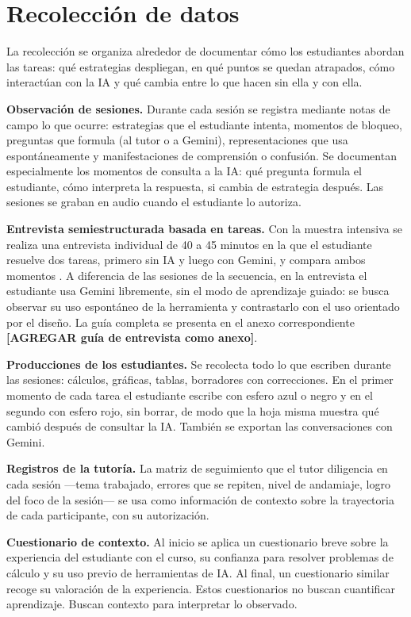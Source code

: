 \section{Recolección de datos}

La recolección se organiza alrededor de documentar cómo los estudiantes abordan las tareas: qué estrategias despliegan, en qué puntos se quedan atrapados, cómo interactúan con la IA y qué cambia entre lo que hacen sin ella y con ella.

\textbf{Observación de sesiones.} Durante cada sesión se registra mediante notas de campo lo que ocurre: estrategias que el estudiante intenta, momentos de bloqueo, preguntas que formula (al tutor o a Gemini), representaciones que usa espontáneamente y manifestaciones de comprensión o confusión. Se documentan especialmente los momentos de consulta a la IA: qué pregunta formula el estudiante, cómo interpreta la respuesta, si cambia de estrategia después. Las sesiones se graban en audio cuando el estudiante lo autoriza.

\textbf{Entrevista semiestructurada basada en tareas.} Con la muestra intensiva se realiza una entrevista individual de 40 a 45 minutos en la que el estudiante resuelve dos tareas, primero sin IA y luego con Gemini, y compara ambos momentos \parencite{goldin2000scientific}. A diferencia de las sesiones de la secuencia, en la entrevista el estudiante usa Gemini libremente, sin el modo de aprendizaje guiado: se busca observar su uso espontáneo de la herramienta y contrastarlo con el uso orientado por el diseño. La guía completa se presenta en el anexo correspondiente \textbf{[AGREGAR guía de entrevista como anexo]}.

\textbf{Producciones de los estudiantes.} Se recolecta todo lo que escriben durante las sesiones: cálculos, gráficas, tablas, borradores con correcciones. En el primer momento de cada tarea el estudiante escribe con esfero azul o negro y en el segundo con esfero rojo, sin borrar, de modo que la hoja misma muestra qué cambió después de consultar la IA. También se exportan las conversaciones con Gemini.

\textbf{Registros de la tutoría.} La matriz de seguimiento que el tutor diligencia en cada sesión ---tema trabajado, errores que se repiten, nivel de andamiaje, logro del foco de la sesión--- se usa como información de contexto sobre la trayectoria de cada participante, con su autorización.

\textbf{Cuestionario de contexto.} Al inicio se aplica un cuestionario breve sobre la experiencia del estudiante con el curso, su confianza para resolver problemas de cálculo y su uso previo de herramientas de IA. Al final, un cuestionario similar recoge su valoración de la experiencia. Estos cuestionarios no buscan cuantificar aprendizaje. Buscan contexto para interpretar lo observado.


